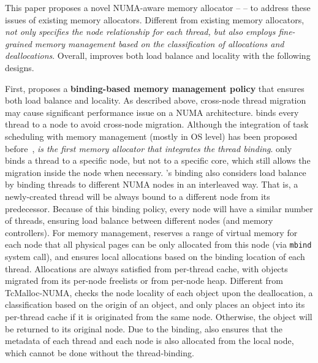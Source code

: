
This paper proposes a novel NUMA-aware memory allocator -- \NM{} -- to address these  issues of existing memory allocators. Different from existing memory allocators, \NM{} \textit{not only specifies the node relationship for each thread, but also employs fine-grained memory management based on the classification of allocations and deallocations}. Overall, \NM{} improves both load balance and locality with the following designs.  


First, \NM{} proposes a \textbf{binding-based memory management policy} that ensures both load balance and locality. As described above, cross-node thread migration may cause significant performance issue on a NUMA architecture. \NM{} binds every thread to a node to avoid cross-node migration. Although the integration of task scheduling with memory management (mostly in OS level) has been proposed before~\cite{Redline, wagle2015numa, diener2015automatic}, \textit{\NM{} is the first memory allocator that integrates the thread binding}. \NM{} only binds a thread to a specific node, but not to a specific core, which still allows the migration inside the node when necessary. \NM{}'s binding also considers load balance by binding threads to different NUMA nodes in an interleaved way. That is, a newly-created thread will be always bound to a different node from its predecessor. Because of this binding policy, every node will have a similar number of threads, ensuring load balance between different nodes (and memory controllers).  For memory management, \NM{} reserves a range of virtual memory for each node that all physical pages can be only allocated from this node (via \texttt{mbind} system call),  and ensures local allocations based on the binding location of each thread. Allocations are always satisfied from per-thread cache, with objects migrated from its per-node freelists or from per-node heap. Different from TcMalloc-NUMA, \NM{} checks the node locality of each object upon the deallocation, a classification based on the origin of an object, and only places an object into its per-thread cache if it is originated from the same node. Otherwise, the object will be returned to its original node. Due to the binding, \NM{} also ensures that the metadata of each thread and each node is also allocated from the local node, which cannot be done without the thread-binding.  



